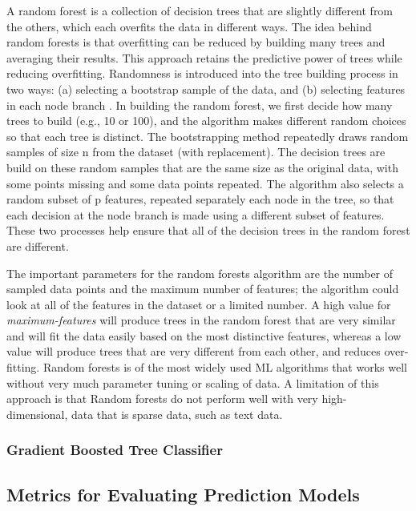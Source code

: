 \documentclass[sigconf]{acmart}
\begin{document}
A random forest is a collection of decision trees that are slightly different 
from the others, which each overfits the data in different ways. The idea 
behind random forests is that overfitting can be reduced by building many 
trees and averaging their results. This approach retains the predictive power 
of trees while reducing overfitting. Randomness is introduced into the tree 
building process in two ways: (a) selecting a bootstrap sample of the data, 
and (b) selecting features in each node branch \cite{muller17,raschka17}. In 
building the random forest, we first decide how many trees to build (e.g., 10 
or 100), and the algorithm makes different random choices so that each tree is 
distinct. The bootstrapping method repeatedly draws random samples of size n 
from the dataset (with replacement). The decision trees are build on these 
random samples that are the same size as the original data, with some points 
missing and some data points repeated. The algorithm also selects a random 
subset of p features, repeated separately each node in the tree, so that 
each decision at the node branch is made using a different subset of features.
These two processes help ensure that all of the decision trees in the random
forest are different. 

The important parameters for the random forests 
algorithm are the number of sampled data points and the maximum number of 
features; the algorithm could look at all of the features in the dataset
or a limited number. A high value for \emph{maximum-features} will produce 
trees in the random forest that are very similar and will fit the data 
easily based on the most distinctive features, whereas a low value will 
produce trees that are very different from each other, and reduces over-
fitting. Random forests is of the most widely used ML algorithms that works 
well without very much parameter tuning or scaling of data. A limitation of 
this approach is that Random forests do not perform well with very high-
dimensional, data that is sparse data, such as text data.

\subsubsection{Gradient Boosted Tree Classifier}


\subsection{Metrics for Evaluating Prediction Models}
\end{document}
